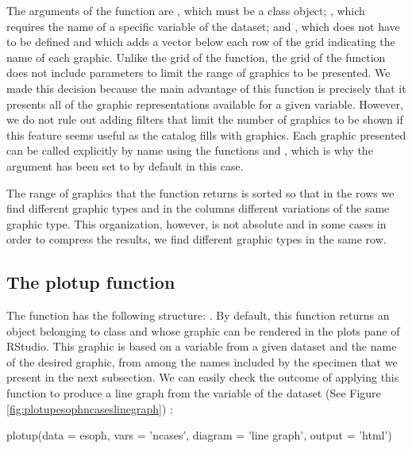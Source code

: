 The arguments of the function are , which must be a
 class object; , which requires the name of
a specific variable of the dataset; and , which does not
have to be defined and which adds a vector below each row of the grid
indicating the name of each graphic. Unlike the grid of the
 function, the grid of the  function does
not include parameters to limit the range of graphics to be presented.
We made this decision because the main advantage of this function is
precisely that it presents all of the graphic representations available
for a given variable. However, we do not rule out adding filters that
limit the number of graphics to be shown if this feature seems useful as
the catalog fills with graphics. Each graphic presented can be called
explicitly by name using the functions  and
, which is why the argument  has been set to
 by default in this case.

The range of graphics that the  function returns is
sorted so that in the rows we find different graphic types and in the
columns different variations of the same graphic type. This
organization, however, is not absolute and in some cases in order to
compress the results, we find different graphic types in the same row.

\hypertarget{the-plotup-function}{%
	\subsection{The plotup function}\label{the-plotup-function}}

The  function has the following structure:
. By default,
this function returns an object belonging to class  and 
 whose graphic can be rendered in the plots pane of RStudio. 
This graphic is based on a variable from a given dataset and the name 
of the desired graphic, from among the names included by the specimen 
that we present in the next subsection. We can easily check the outcome 
of applying this function to produce a line graph from the variable 
 of the dataset  (See Figure 
\ref{fig:plotupesophncaseslinegraph}) :


\begin{example}
  plotup(data = esoph, vars = 'ncases', diagram = 'line graph', output = 'html')
\end{example}



